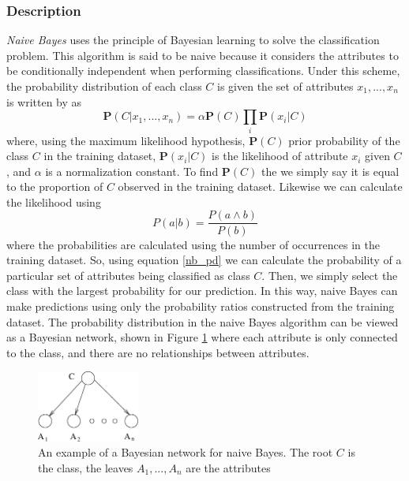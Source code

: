 \documentclass{article}
\newcommand{\ve}[1]{\boldsymbol{\mathbf{#1}}}
\begin{document}
			\subsubsection{Description}
				\label{nb_des}
				\textit{Naive Bayes} uses the principle of Bayesian learning to solve the classification problem. 
				This algorithm is said to be naive because it considers the attributes to be conditionally independent when performing classifications. 
				Under this scheme, the probability distribution of each class $C$ is given the set of attributes $x_1,...,x_n$ is written by \cite{ai} as
				\begin{equation}					
					\ve{P}(C|x_1,...,x_n) = \alpha \ve{P}(C) \prod_i \ve{P}(x_i| C) \label{nb_pd}
				\end{equation}
				where, using the maximum likelihood hypothesis, $\ve{P}(C)$ prior probability of the class $C$ in the training dataset, $\ve{P}(x_i|C)$ is the likelihood of attribute $x_i$ given $C$, and $\alpha$ is a normalization constant. 
				To find $\ve{P}(C)$ the we simply say it is equal to the proportion of $C$ observed in the training dataset. 
				Likewise we can calculate the likelihood using
				\begin{equation*}
					P(a|b) = \frac{P(a \land b)}{P(b)}
				\end{equation*}
				where the probabilities are calculated using the number of occurrences in the training dataset. 
				So, using equation \ref{nb_pd} we can calculate the probability of a particular set of attributes being classified as class $C$. 
				Then, we simply select the class with the largest probability for our prediction. 
				In this way, naive Bayes can make predictions using only the probability ratios constructed from the training dataset. 
				The probability distribution in the naive Bayes algorithm can be viewed as a Bayesian network, shown in Figure \ref{nb} where each attribute is only connected to the class, and there are no relationships between attributes.
				\begin{figure}[h]
					\centering
					\includegraphics[width=0.3\textwidth]{fig/nb}
					\caption{An example of a Bayesian network for naive Bayes. The root $C$ is the class, the leaves $A_1,...,A_n$ are the attributes \cite{Friedman1997}}
					\label{nb}
				\end{figure}
\end{document}
